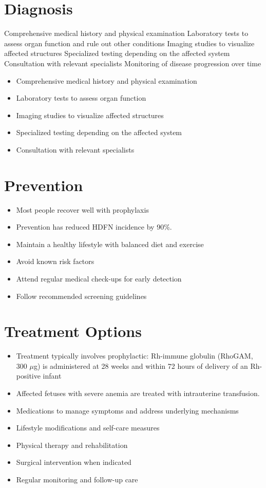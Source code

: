 \section{Diagnosis}
Comprehensive medical history and physical examination Laboratory tests to assess organ function and rule out other conditions Imaging studies to visualize affected structures Specialized testing depending on the affected system Consultation with relevant specialists Monitoring of disease progression over time

\begin{itemize}[noitemsep]
  \item Comprehensive medical history and physical examination
  \item Laboratory tests to assess organ function
  \item Imaging studies to visualize affected structures
  \item Specialized testing depending on the affected system
  \item Consultation with relevant specialists
\end{itemize}
\section{Prevention}
\begin{itemize}[noitemsep]
  \item Most people recover well with prophylaxis
  \item Prevention has reduced HDFN incidence by 90\%.
  \item Maintain a healthy lifestyle with balanced diet and exercise
  \item Avoid known risk factors
  \item Attend regular medical check-ups for early detection
  \item Follow recommended screening guidelines
\end{itemize}
\section{Treatment Options}
\begin{itemize}[noitemsep]
  \item Treatment typically involves prophylactic: Rh-immune globulin (RhoGAM, 300 $\mu$g) is administered at 28 weeks and within 72 hours of delivery of an Rh-positive infant
  \item Affected fetuses with severe anemia are treated with intrauterine transfusion.
  \item Medications to manage symptoms and address underlying mechanisms
  \item Lifestyle modifications and self-care measures
  \item Physical therapy and rehabilitation
  \item Surgical intervention when indicated
  \item Regular monitoring and follow-up care
\end{itemize}
